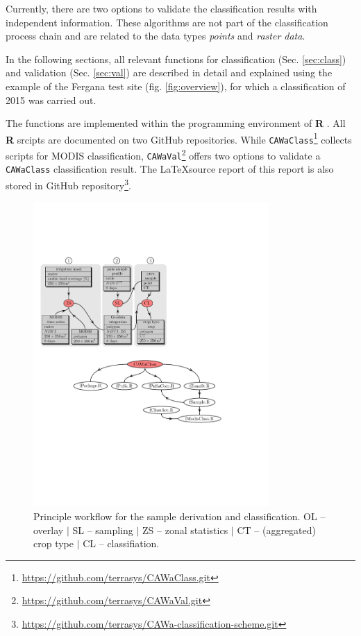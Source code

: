 Currently, there are two options to validate the classification results with independent information. These algorithms  are not part of the classification process chain and are related to the data types \textit{points} and \textit{raster data}.\

In the following sections, all relevant functions for classification (Sec. \ref{sec:class}) and validation (Sec. \ref{sec:val}) are described in detail and explained using the example of the Fergana test site (fig. \ref{fig:overview}), for which a classification of 2015 was carried out.\ 

The functions are implemented within the programming environment of \textbf{R} \citep[version 3.5.1; ][]{R2017}. All \textbf{R} srcipts are documented on two GitHub repositories. While \texttt{CAWaClass}\footnote{\url{https://github.com/terrasys/CAWaClass.git}} collects scripts for MODIS classification, \texttt{CAWaVal}\footnote{\url{https://github.com/terrasys/CAWaVal.git}} offers two options to validate a \texttt{CAWaClass} classification result. The \LaTeX  source report of this report is also stored in GitHub repository\footnote{\url{https://github.com/terrasys/CAWa-classification-scheme.git}}. 


\begin{figure}[p]
\centering\includegraphics[width=0.8\textwidth]{figures/CaWA_workflow.pdf}
\caption{Principle workflow for the sample derivation and classification. OL -- overlay $|$ SL -- sampling $|$ ZS -- zonal statistics $|$ CT -- (aggregated) crop type  $|$ CL -- classifiation.}\label{fig:workflow}
\end{figure}

